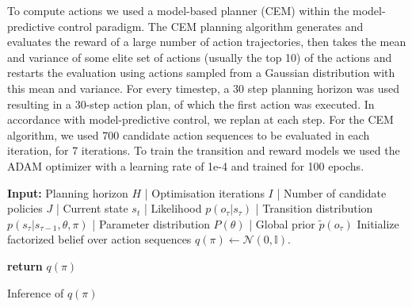 To compute actions we used a model-based planner (CEM) \citep{rubinstein1997optimization} within the model-predictive control paradigm. The CEM planning algorithm generates and evaluates the reward of a large number of action trajectories, then takes the mean and variance of some elite set of actions (usually the top 10) of the actions and restarts the evaluation using actions sampled from a Gaussian distribution with this mean and variance. For every timestep, a 30 step planning horizon was used resulting in a 30-step action plan, of which the first action was executed. In accordance with model-predictive control, we replan at each step. For the CEM algorithm, we used 700 candidate action sequences to be evaluated in each iteration, for 7 iterations. To train the transition and reward models we used the ADAM optimizer with a learning rate of 1e-4 and trained for 100 epochs.

\begin{algorithm}[H]
\label{algo:exps}
\SetAlgoLined
   \DontPrintSemicolon
   \textbf{Input:} Planning horizon $H$ | Optimisation iterations $I$ | Number of candidate policies $J$ | Current state $s_t$ | Likelihood $p(o_\tau|s_\tau)$ |  Transition distribution $p(s_\tau|s_{\tau-1}, \theta, \pi)$ | Parameter distribution $P(\theta)$ | Global prior $\tilde{p}(o_\tau)$
   \BlankLine
   Initialize factorized belief over action sequences $q(\pi) \leftarrow \mathcal{N}(0,\mathbb{I})$.
   
\textbf{return} $q(\pi)$
\caption{Inference of $q(\pi)$}
\end{algorithm}

